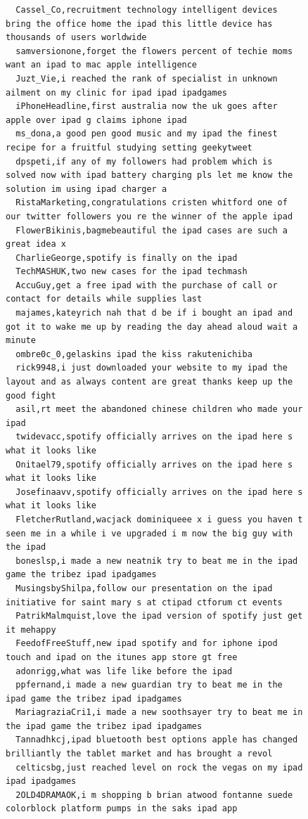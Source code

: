 \begin{figure}[htpb]
\begin{verbatim}
  Cassel_Co,recruitment technology intelligent devices bring the office home the ipad this little device has thousands of users worldwide
  samversionone,forget the flowers percent of techie moms want an ipad to mac apple intelligence
  Juzt_Vie,i reached the rank of specialist in unknown ailment on my clinic for ipad ipad ipadgames
  iPhoneHeadline,first australia now the uk goes after apple over ipad g claims iphone ipad
  ms_dona,a good pen good music and my ipad the finest recipe for a fruitful studying setting geekytweet
  dpspeti,if any of my followers had problem which is solved now with ipad battery charging pls let me know the solution im using ipad charger a
  RistaMarketing,congratulations cristen whitford one of our twitter followers you re the winner of the apple ipad
  FlowerBikinis,bagmebeautiful the ipad cases are such a great idea x
  CharlieGeorge,spotify is finally on the ipad
  TechMASHUK,two new cases for the ipad techmash
  AccuGuy,get a free ipad with the purchase of call or contact for details while supplies last
  majames,kateyrich nah that d be if i bought an ipad and got it to wake me up by reading the day ahead aloud wait a minute
  ombre0c_0,gelaskins ipad the kiss rakutenichiba
  rick9948,i just downloaded your website to my ipad the layout and as always content are great thanks keep up the good fight
  asil,rt meet the abandoned chinese children who made your ipad
  twidevacc,spotify officially arrives on the ipad here s what it looks like
  Onitael79,spotify officially arrives on the ipad here s what it looks like
  Josefinaavv,spotify officially arrives on the ipad here s what it looks like
  FletcherRutland,wacjack dominiqueee x i guess you haven t seen me in a while i ve upgraded i m now the big guy with the ipad
  boneslsp,i made a new neatnik try to beat me in the ipad game the tribez ipad ipadgames
  MusingsbyShilpa,follow our presentation on the ipad initiative for saint mary s at ctipad ctforum ct events
  PatrikMalmquist,love the ipad version of spotify just get it mehappy
  FeedofFreeStuff,new ipad spotify and for iphone ipod touch and ipad on the itunes app store gt free
  adonrigg,what was life like before the ipad
  ppfernand,i made a new guardian try to beat me in the ipad game the tribez ipad ipadgames
  MariagraziaCri1,i made a new soothsayer try to beat me in the ipad game the tribez ipad ipadgames
  Tannadhkcj,ipad bluetooth best options apple has changed brilliantly the tablet market and has brought a revol
  celticsbg,just reached level on rock the vegas on my ipad ipad ipadgames
  2OLD4DRAMAOK,i m shopping b brian atwood fontanne suede colorblock platform pumps in the saks ipad app

\end{verbatim}
\end{figure}
